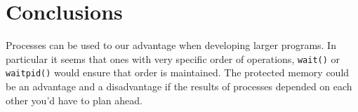 
\section{Conclusions}\label{sec:conclusions}

    Processes can be used to our advantage when developing larger programs.
    In particular it seems that ones with very specific order of operations, \texttt{wait()} or \texttt{waitpid()} would ensure that order is maintained.
    The protected memory could be an advantage and a disadvantage if the results of processes depended on each other you'd have to plan ahead.
